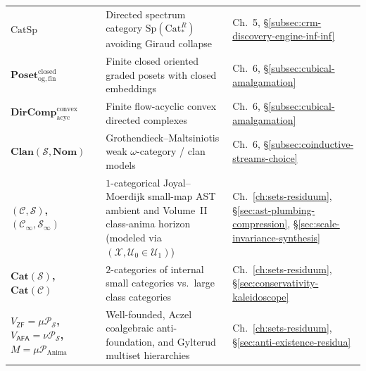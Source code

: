 \documentclass[10pt,twoside,openright]{book}
\theoremstyle{crmplain}
\theoremstyle{crmdef}
\theoremstyle{crmremark}
\begin{document}
{\begin{xltabular}{\textwidth}{@{}>{\bfseries}P{0.24\textwidth}YP{0.21\textwidth}@{}}
$\mathrm{CatSp}$ & Directed spectrum category $\mathrm{Sp}(\mathrm{Cat}^R_*)$ avoiding Giraud collapse & Ch.~5, \S\ref{subsec:crm-discovery-engine-inf-inf} \\
$\mathbf{Poset}_{\mathrm{og,fin}}^{\mathrm{closed}}$ & Finite closed oriented graded posets with closed embeddings & Ch.~6, \S\ref{subsec:cubical-amalgamation} \\
$\mathbf{DirComp}_{\mathrm{acyc}}^{\mathrm{convex}}$ & Finite flow-acyclic convex directed complexes & Ch.~6, \S\ref{subsec:cubical-amalgamation} \\
$\mathbf{Clan}(\mathcal{S}, \mathbf{Nom})$ & Grothendieck--Maltsiniotis weak $\omega$-category / clan models & Ch.~6, \S\ref{subsec:coinductive-streams-choice} \\
$(\mathcal{C}, \mathcal{S})$,\, $(\mathcal{C}_\infty, \mathcal{S}_\infty)$ & $1$-categorical Joyal--Moerdijk small-map AST ambient and Volume~II class-anima horizon (modeled via $(\mathcal{X}, \mathcal{U}_0 \in \mathcal{U}_1)$) & Ch.~\ref{ch:sets-residuum}, \S\ref{sec:ast-plumbing-compression}, \S\ref{sec:scale-invariance-synthesis} \\
$\mathbf{Cat}(\mathcal{S})$,\, $\mathbf{Cat}(\mathcal{C})$ & $2$-categories of internal small categories vs.\ large class categories & Ch.~\ref{ch:sets-residuum}, \S\ref{sec:conservativity-kaleidoscope} \\
$V_{\mathsf{ZF}} = \mu\mathcal{P}_{\mathcal{S}}$, $V_{\mathsf{AFA}} = \nu\mathcal{P}_{\mathcal{S}}$, $M = \mu\mathcal{P}_{\mathrm{Anima}}$ & Well-founded, Aczel coalgebraic anti-foundation, and Gylterud multiset hierarchies & Ch.~\ref{ch:sets-residuum}, \S\ref{sec:anti-existence-residua} \\
\end{xltabular}\par}

\vspace{1.0em}
\end{document}
